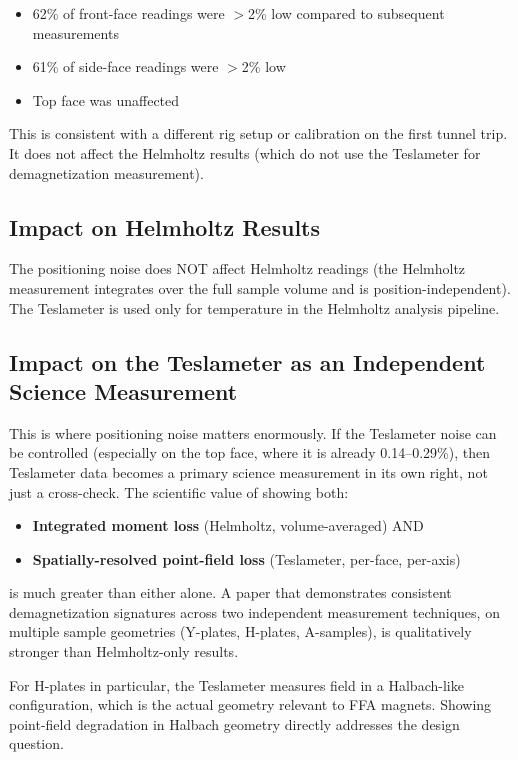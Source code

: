 \documentclass[11pt,letterpaper]{article}
\begin{document}
\begin{itemize}[nosep]
  \item 62\% of front-face readings were $>$2\% low compared to subsequent measurements
  \item 61\% of side-face readings were $>$2\% low
  \item Top face was unaffected
\end{itemize}

This is consistent with a different rig setup or calibration on the first tunnel
trip. It does not affect the Helmholtz results (which do not use the Teslameter
for demagnetization measurement).

\subsection{Impact on Helmholtz Results}

The positioning noise does NOT affect Helmholtz readings (the Helmholtz
measurement integrates over the full sample volume and is position-independent).
The Teslameter is used only for temperature in the Helmholtz analysis pipeline.

\subsection{Impact on the Teslameter as an Independent Science Measurement}

This is where positioning noise matters enormously. If the Teslameter noise can
be controlled (especially on the top face, where it is already 0.14--0.29\%),
then Teslameter data becomes a primary science measurement in its own right, not
just a cross-check. The scientific value of showing both:

\begin{itemize}[nosep]
  \item \textbf{Integrated moment loss} (Helmholtz, volume-averaged) AND
  \item \textbf{Spatially-resolved point-field loss} (Teslameter, per-face, per-axis)
\end{itemize}

\noindent is much greater than either alone. A paper that demonstrates consistent
demagnetization signatures across two independent measurement techniques, on
multiple sample geometries (Y-plates, H-plates, A-samples), is qualitatively
stronger than Helmholtz-only results.

For H-plates in particular, the Teslameter measures field in a Halbach-like
configuration, which is the actual geometry relevant to FFA magnets. Showing
point-field degradation in Halbach geometry directly addresses the design
question.
\end{document}
